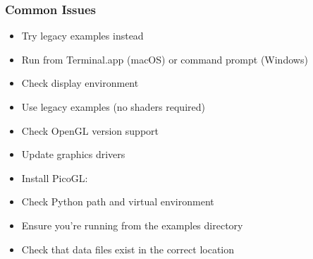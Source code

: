 \documentclass[a4paper,10pt,english,openany,oneside]{sphinxmanual}
\begin{document}
\subsubsection{Common Issues}
\label{\detokenize{examples:common-issues}}\begin{description}
\begin{itemize}
\item {} 
\sphinxAtStartPar
Try legacy examples instead

\item {} 
\sphinxAtStartPar
Run from Terminal.app (macOS) or command prompt (Windows)

\item {} 
\sphinxAtStartPar
Check display environment

\end{itemize}

\begin{itemize}
\item {} 
\sphinxAtStartPar
Use legacy examples (no shaders required)

\item {} 
\sphinxAtStartPar
Check OpenGL version support

\item {} 
\sphinxAtStartPar
Update graphics drivers

\end{itemize}

\begin{itemize}
\item {} 
\sphinxAtStartPar
Install PicoGL: 

\item {} 
\sphinxAtStartPar
Check Python path and virtual environment

\end{itemize}

\begin{itemize}
\item {} 
\sphinxAtStartPar
Ensure you’re running from the examples directory

\item {} 
\sphinxAtStartPar
Check that data files exist in the correct location

\end{itemize}


\end{description}
\end{document}
